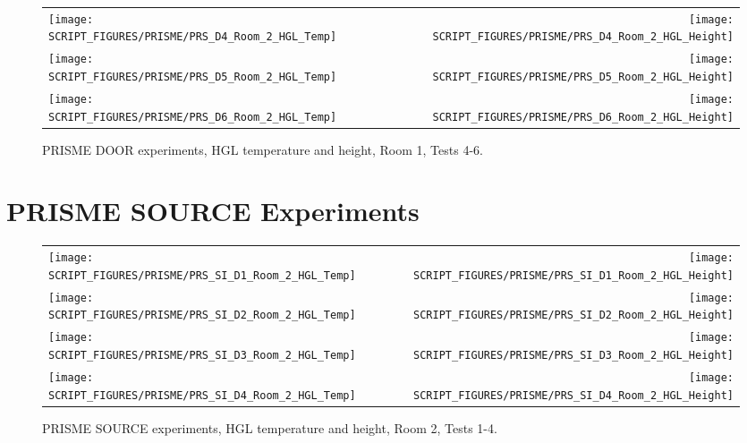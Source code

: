 \begin{figure}[p]
\begin{tabular*}{\textwidth}{l@{\extracolsep{\fill}}r}
\texttt{[image: SCRIPT\_FIGURES/PRISME/PRS\_D4\_Room\_2\_HGL\_Temp]} &
\texttt{[image: SCRIPT\_FIGURES/PRISME/PRS\_D4\_Room\_2\_HGL\_Height]} \\
\texttt{[image: SCRIPT\_FIGURES/PRISME/PRS\_D5\_Room\_2\_HGL\_Temp]} &
\texttt{[image: SCRIPT\_FIGURES/PRISME/PRS\_D5\_Room\_2\_HGL\_Height]} \\
\texttt{[image: SCRIPT\_FIGURES/PRISME/PRS\_D6\_Room\_2\_HGL\_Temp]} &
\texttt{[image: SCRIPT\_FIGURES/PRISME/PRS\_D6\_Room\_2\_HGL\_Height]}
\end{tabular*}
\caption[PRISME DOOR experiments, HGL temperature and height, Room 2, Tests 4-6]
{PRISME DOOR experiments, HGL temperature and height, Room 1, Tests 4-6.}
\label{PRISME_HGL_4}
\end{figure}


\clearpage

\section{PRISME SOURCE Experiments}

\begin{figure}[!ht]
\begin{tabular*}{\textwidth}{l@{\extracolsep{\fill}}r}
\texttt{[image: SCRIPT\_FIGURES/PRISME/PRS\_SI\_D1\_Room\_2\_HGL\_Temp]} &
\texttt{[image: SCRIPT\_FIGURES/PRISME/PRS\_SI\_D1\_Room\_2\_HGL\_Height]} \\
\texttt{[image: SCRIPT\_FIGURES/PRISME/PRS\_SI\_D2\_Room\_2\_HGL\_Temp]} &
\texttt{[image: SCRIPT\_FIGURES/PRISME/PRS\_SI\_D2\_Room\_2\_HGL\_Height]} \\
\texttt{[image: SCRIPT\_FIGURES/PRISME/PRS\_SI\_D3\_Room\_2\_HGL\_Temp]} &
\texttt{[image: SCRIPT\_FIGURES/PRISME/PRS\_SI\_D3\_Room\_2\_HGL\_Height]} \\
\texttt{[image: SCRIPT\_FIGURES/PRISME/PRS\_SI\_D4\_Room\_2\_HGL\_Temp]} &
\texttt{[image: SCRIPT\_FIGURES/PRISME/PRS\_SI\_D4\_Room\_2\_HGL\_Height]}
\end{tabular*}
\caption[PRISME SOURCE experiments, HGL temperature and height, Room 2, Tests 1-4]
{PRISME SOURCE experiments, HGL temperature and height, Room 2, Tests 1-4.}
\label{PRISME_SI_HGL_1}
\end{figure}

